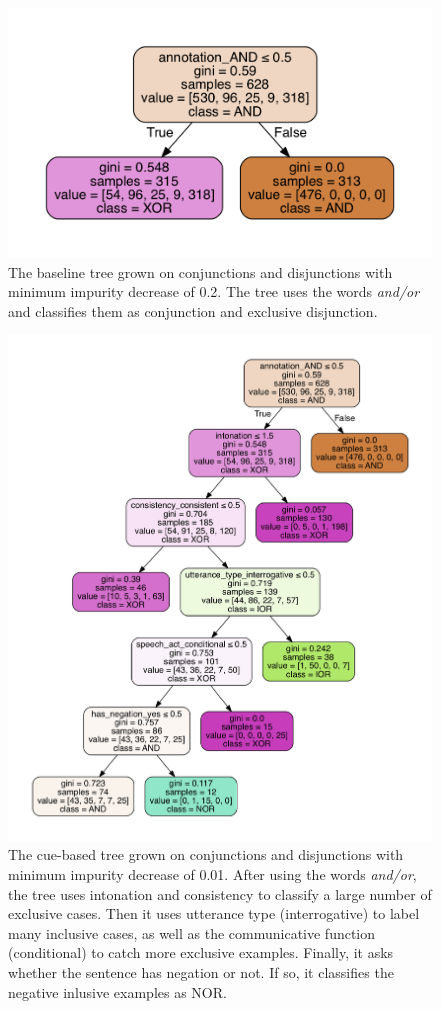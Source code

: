 \documentclass[,man,floatsintext]{apa6}
\begin{document}
\begin{figure}
\centering
\includegraphics{figs/wholeBaseline-1.pdf}
\caption{\label{fig:wholeBaseline}The baseline tree grown on conjunctions and disjunctions with minimum impurity decrease of 0.2. The tree uses the words \textit{and/or} and classifies them as conjunction and exclusive disjunction.}
\end{figure}

\begin{figure}
\centering
\includegraphics{figs/wholeCueBased-1.pdf}
\caption{\label{fig:wholeCueBased}The cue-based tree grown on conjunctions and disjunctions with minimum impurity decrease of 0.01. After using the words \textit{and/or}, the tree uses intonation and consistency to classify a large number of exclusive cases. Then it uses utterance type (interrogative) to label many inclusive cases, as well as the communicative function (conditional) to catch more exclusive examples. Finally, it asks whether the sentence has negation or not. If so, it classifies the negative inlusive examples as NOR.}
\end{figure}
\end{document}
